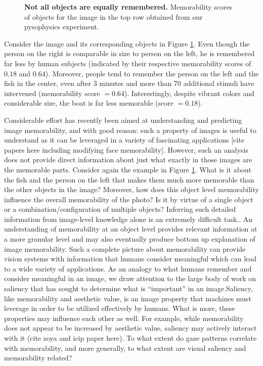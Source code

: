 \begin{figure}[t]
\centering
{}
\vspace{-5mm}\caption{\footnotesize\textbf{Not all objects are equally remembered.} Memorability scores of objects for the image in the top row obtained from our pysophysics experiment. }\label{fig:introPhoto}
\end{figure}

Consider the image and its corresponding objects in Figure \ref{fig:introPhoto}. Even though the person on the right is comparable in size to person on the left, he is remembered far less by human subjects (indicated by their respective memorability scores of $0.18$ and $0.64$). Moreover, people tend to remember the person on the left and the fish in the center, even after $3$ minutes and more than 70 additional stimuli have intervened (memorability score $= 0.64$). Interestingly, despite vibrant colors and considerable size, the boat is far less memorable (score $= 0.18$).

Considerable effort has recently been aimed at understanding and predicting image memorability, and with good reason: such a property of images is useful to understand as it can be leveraged in a variety of fascinating applications [cite papers here including modifying face memorability]. However, such an analysis does not provide direct information about just what exactly in those images are the memorable parts. Consider again the example in Figure \ref{fig:introPhoto}. What is it about the fish and the person on the left that makes them much more memorable than the other objects in the image? Moreover, how does this object level memorability influence the overall memorability of the photo? Is it by virtue of a single object or a combination/configuration of multiple objects? Inferring such detailed information from image-level knowledge alone is an extremely difficult task.. An understanding of memorability at an object level provides relevant information at a more granular level and may also eventually produce bottom up explanation of image memorability. Such a complete picture about memorability can provide vision systems with information that humans consider meaningful which can lead to a wide variety of applications. As an analogy to what humans remember and consider meaningful in an image, we draw attention to the large body of work on saliency that has sought to determine what is “important” in an image.Saliency, like memorability and aesthetic value, is an image property that machines must leverage in order to be utilized effectively by humans. What is more, these properties may influence each other as well. For example, while memorability does not appear to be increased by aesthetic value, saliency may actively interact with it (cite zoya and icip paper here). To what extent do gaze patterns correlate with memorability, and more generally, to what extent are visual saliency and memorability related?

